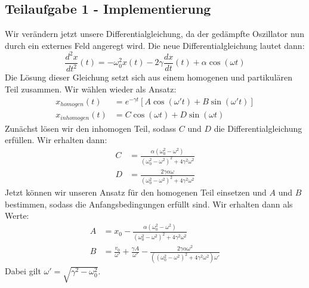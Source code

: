 \documentclass[12pt,a4paper]{article}
\begin{document}
\subsection{Teilaufgabe 1 - Implementierung}
Wir verändern jetzt unsere Differentialgleichung, da der  gedämpfte Oszillator nun durch ein externes Feld angeregt wird. Die neue Differentialgleichung lautet dann:
\begin{equation}
	\frac{d^2x}{dt^2}(t) = -\omega_0^2x(t) - 2\gamma\frac{dx}{dt}(t) + \alpha\cos(\omega t)
\end{equation}
Die Lösung dieser Gleichung setzt sich aus einem homogenen und partikulären Teil zusammen. Wir wählen wieder als Ansatz:
\begin{align}
	x_{homogen}(t) &= e^{-\gamma t}\left[A\cos(\omega't)+B\sin(\omega't)\right] \\
	x_{inhomogen}(t) &= C\cos(\omega t) + D\sin(\omega t)
\end{align}
Zunächst lösen wir den inhomogen Teil, sodass $C$ und $D$ die Differentialgleichung erfüllen. Wir erhalten dann:
\begin{align*}
	C &= \frac{\alpha(\omega_0^2 - \omega^2)}{(\omega_0^2 - \omega^2)^2+ 4\gamma^2\omega^2} \\
	D &= \frac{2\gamma\alpha\omega}{(\omega_0^2 - \omega^2)^2+ 4\gamma^2\omega^2}
\end{align*}
Jetzt können wir unseren Ansatz für den homogenen Teil einsetzen und $A$ und $B$ bestimmen, sodass die Anfangsbedingungen erfüllt sind.  Wir erhalten dann als Werte:
\begin{align*}
	A &= x_0 - \frac{\alpha (\omega_0^2 -\omega^2)}{(\omega_0^2 - \omega^2)^2+ 4\gamma^2\omega^2} \\
	B &= \frac{v_0}{\omega'} + \frac{\gamma A}{\omega'} - \frac{2\gamma\alpha\omega^2}{((\omega_0^2 - \omega^2)^2+ 4\gamma^2\omega^2)\omega'}
\end{align*}
Dabei gilt $\omega' = \sqrt{\gamma^2 -\omega_0^2}$.
\end{document}
